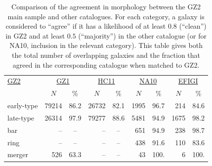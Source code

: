 \documentclass[useAMS,usenatbib]{mn2e}
\begin{document}
\begin{table}
\centering
 \begin{tabular}{@{}lrcrcrcrc}
 \hline
\multicolumn{1}{l}{\underline{GZ2}} &
\multicolumn{2}{c}{\underline{GZ1}} &
\multicolumn{2}{c}{\underline{HC11}} &
\multicolumn{2}{c}{\underline{NA10}} &
\multicolumn{2}{c}{\underline{EFIGI}}
\\ 
\multicolumn{1}{l}{} &
\multicolumn{1}{c}{$N$} &
\multicolumn{1}{c}{\%} &
\multicolumn{1}{c}{$N$} &
\multicolumn{1}{c}{\%} &
\multicolumn{1}{c}{$N$} &
\multicolumn{1}{c}{\%} &
\multicolumn{1}{c}{$N$} &
\multicolumn{1}{c}{\%}
\\ 
\hline					
early-type     & 79214    & 86.2     & 26732    & 82.1   & 1995    & 96.7    & 214     & 84.6       \\
late-type      & 26314    & 97.9     & 79277    & 88.6   & 5481    & 94.9    & 1675    & 98.2       \\
bar            & --       &  --      & --       &  --    & 651     & 94.9    & 238     & 98.7       \\
ring           & --       &  --      & --       &  --    & 438     & 91.6    & 110     & 83.6       \\
merger         & 526      & 63.3     & --       &  --    & 43      & 100.    & 6       & 100.       \\
\hline
 \end{tabular}
 \caption{Comparison of the agreement in morphology between the GZ2 main sample and other catalogues. For each category, a galaxy is considered to ``agree'' if it has a likelihood of at least $0.8$ (``clean'') in GZ2 and at least $0.5$ (``majority'') in the other catalogue (or for NA10, inclusion in the relevant category). This table gives both the total number of overlapping galaxies and the fraction that agreed in the corresponding catalogue when matched to GZ2. \label{tbl-compare}}
\end{table}

\end{document}
